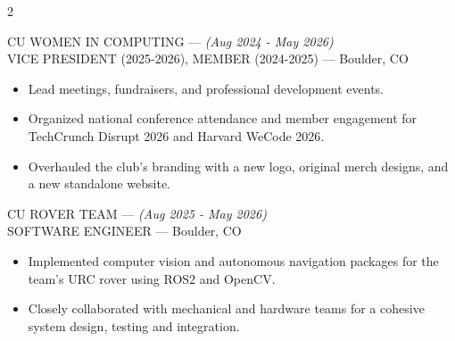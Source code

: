 \documentclass[10pt,letterpaper,ragged2e,withhyper]{altacv}
\newcommand{\experience}[4]{
  \textcolor{subheading}{\MakeUppercase{#1}} \hspace{0.2cm}--- \hspace{0.2cm} \emph{(#2)}\\
  {\MakeUppercase{#3}} \hspace{0.2cm}---\hspace{0.2cm}   #4
  \vspace{4pt}  %
}
\begin{document}
\begin{paracol}{2}
\vspace{0.8em}

\experience
  {CU Women in Computing}
  {Aug 2024 - May 2026}
  {Vice President (2025-2026), Member (2024-2025)}
  {Boulder, CO}
\begin{itemize}
  \item Lead meetings, fundraisers, and professional development events.
  \item Organized national conference attendance and member engagement for TechCrunch Disrupt 2026 and Harvard WeCode 2026.
  \item Overhauled the club's branding with a new logo, original merch designs, and a new standalone website.
\end{itemize}

\divider

\experience
  {CU Rover Team}
  {Aug 2025 - May 2026}
  {Software Engineer}
  {Boulder, CO}
\begin{itemize}
  \item Implemented computer vision and autonomous navigation packages for the team's URC rover using ROS2 and OpenCV.
  \item Closely collaborated with mechanical and hardware teams for a cohesive system design, testing and integration.
\end{itemize}

\end{paracol}
\end{document}
